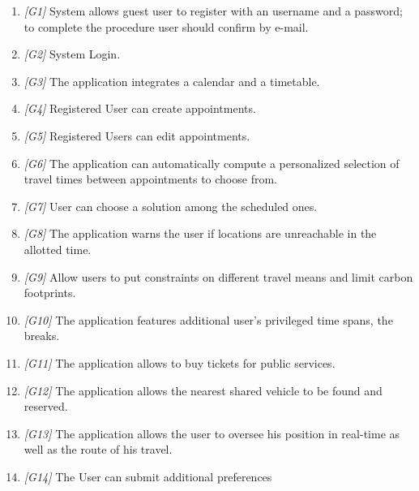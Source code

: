 \begin{enumerate}
	\item \textit{[G1]} 
		System allows guest user to register with an username and a password; to complete the procedure user should confirm by e-mail.
	\item \textit{[G2]} System Login.
	\item \textit{[G3]} The application integrates a calendar and a timetable.
	\item \textit{[G4]} Registered User can create appointments. 
	\item \textit{[G5]} Registered Users can edit appointments.
	\item \textit{[G6]} The application can automatically compute a personalized selection of travel times between appointments to choose from.
	\item \textit{[G7]} User can choose a solution among the scheduled ones.
	\item \textit{[G8]} The application warns the user if locations are unreachable in the allotted time.
	\item \textit{[G9]} Allow users to put constraints on different travel means and limit carbon footprints.
	\item \textit{[G10]} The application features additional user’s privileged time spans, the breaks.
	\item \textit{[G11]} The application allows to buy tickets for public services.
	\item \textit{[G12]} The application allows the nearest shared vehicle to be found and reserved.
	\item \textit{[G13]} The application allows the user to oversee his position in real-time as well as the route of his travel.
	\item \textit{[G14]} The User can submit additional preferences
		
\end{enumerate}	


